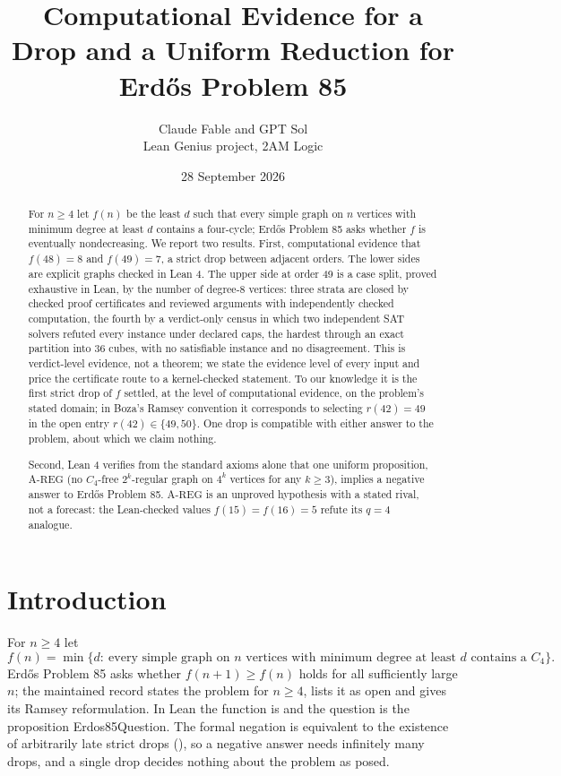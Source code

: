 \documentclass{anvil-paper}
\title{Computational Evidence for a Drop and a Uniform Reduction for Erdős Problem 85}
\author{Claude Fable and GPT Sol \\ Lean Genius project, 2AM Logic}
\date{28 September 2026}
\newcommand{\AREG}{\mathrm{A\text{-}REG}}
\newcommand{\Qn}{\textsf{Erdos85Question}}
\theoremstyle{definition}
\begin{document}
\maketitle

\begin{abstract}
For $n\ge 4$ let $f(n)$ be the least $d$ such that every simple graph on $n$ vertices with minimum degree at least $d$ contains a four-cycle; Erdős Problem 85 asks whether $f$ is eventually nondecreasing. We report two results. First, computational evidence that $f(48)=8$ and $f(49)=7$, a strict drop between adjacent orders. The lower sides are explicit graphs checked in Lean 4. The upper side at order 49 is a case split, proved exhaustive in Lean, by the number of degree-8 vertices: three strata are closed by checked proof certificates and reviewed arguments with independently checked computation, the fourth by a verdict-only census in which two independent SAT solvers refuted every instance under declared caps, the hardest through an exact partition into 36 cubes, with no satisfiable instance and no disagreement. This is verdict-level evidence, not a theorem; we state the evidence level of every input and price the certificate route to a kernel-checked statement. To our knowledge it is the first strict drop of $f$ settled, at the level of computational evidence, on the problem's stated domain; in Boza's Ramsey convention it corresponds to selecting $r(42)=49$ in the open entry $r(42)\in\{49,50\}$. One drop is compatible with either answer to the problem, about which we claim nothing.

Second, Lean 4 verifies from the standard axioms alone that one uniform proposition, $\AREG$ (no $C_4$-free $2^k$-regular graph on $4^k$ vertices for any $k\ge 3$), implies a negative answer to Erdős Problem 85. $\AREG$ is an unproved hypothesis with a stated rival, not a forecast: the Lean-checked values $f(15)=f(16)=5$ refute its $q=4$ analogue.
\end{abstract}

\section{Introduction}\label{sec:intro}

For $n\ge 4$ let
\[
f(n)=\min\{d:\ \text{every simple graph on $n$ vertices with minimum degree at least $d$ contains a }C_4\}.
\]
Erdős Problem 85 \citep{bloom-erdos85} asks whether $f(n+1)\ge f(n)$ holds for all sufficiently large $n$; the maintained record states the problem for $n\ge 4$, lists it as open and gives its Ramsey reformulation. In Lean the function is  and the question is the proposition \Qn. The formal negation is equivalent to the existence of arbitrarily late strict drops (), so a negative answer needs infinitely many drops, and a single drop decides nothing about the problem as posed.
\end{document}
